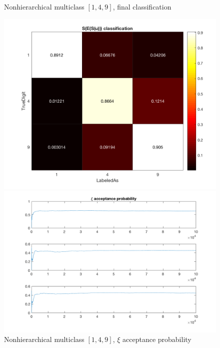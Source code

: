 \documentclass{siamart1116}
\begin{document}
    \begin{figure}[!htb]
        \begin{minipage}{0.48\textwidth}
            \centering
            \caption{\label{fig:multiclass_nonhier_table} Nonhierarchical multiclass $[1, 4, 9]$, final classification}
            \includegraphics[width=\linewidth]{multiclass/nonhier/table.png}
        \end{minipage}\hfill
        \begin{minipage}{0.48\textwidth}
            \centering
            \caption{\label{fig:multiclass_nonhier_accept} Nonhierarchical multiclass $[1, 4, 9]$, $\xi$ acceptance probability}
            \includegraphics[width=\linewidth]{multiclass/nonhier/xi_accept.png}
        \end{minipage}
    \end{figure}
\end{document}

